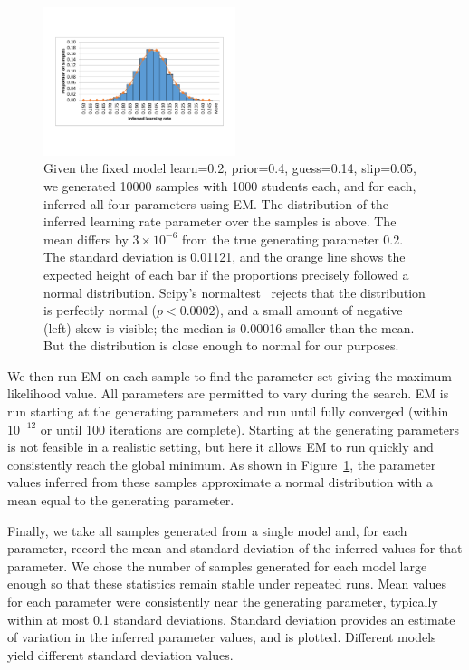 \documentclass{edm_template}
\begin{document}
\begin{figure}
\centering
\includegraphics[width=0.5\textwidth]{data/normal.pdf}
\caption{Given the fixed model learn=0.2, prior=0.4, guess=0.14, slip=0.05, we generated 10000 samples with 1000 students each, and for each, inferred all four parameters using EM. The distribution of the inferred learning rate parameter over the samples is above. The mean differs by $3 \times 10^{-6}$ from the true generating parameter 0.2. The standard deviation is 0.01121, and the orange line shows the expected height of each bar if the proportions precisely followed a normal distribution. Scipy's normaltest~\cite{normaltest} rejects that the distribution is perfectly normal ($p < 0.0002$), and a small amount of negative (left) skew is visible; the median is 0.00016 smaller than the mean. But the distribution is close enough to normal for our purposes.}
\label{fig:normal}
\end{figure}

We then run EM on each sample to find the parameter set giving the maximum likelihood value. All parameters are permitted to vary during the search. EM is run starting at the generating parameters and run until fully converged (within $10^{-12}$ or until 100 iterations are complete). Starting at the generating parameters is not feasible in a realistic setting, but here it allows EM to run quickly and consistently reach the global minimum. As shown in Figure~\ref{fig:normal}, the parameter values inferred from these samples approximate a normal distribution with a mean equal to the generating parameter.

Finally, we take all samples generated from a single model and, for each parameter, record the mean and standard deviation of the inferred values for that parameter. We chose the number of samples generated for each model large enough so that these statistics remain stable under repeated runs. Mean values for each parameter were consistently near the generating parameter, typically within at most 0.1 standard deviations. Standard deviation provides an estimate of variation in the inferred parameter values, and is plotted. Different models yield different standard deviation values.
\end{document}
